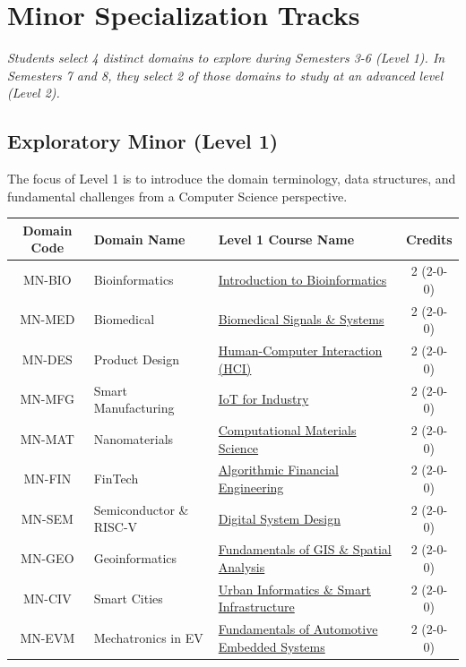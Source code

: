 \newpage
\section*{Minor Specialization Tracks}
\textit{Students select 4 distinct domains to explore during Semesters 3-6 (Level 1). In Semesters 7 and 8, they select 2 of those domains to study at an advanced level (Level 2).}

\label{table:minor_l1}
\subsection*{Exploratory Minor (Level 1)}
\noindent The focus of Level 1 is to introduce the domain terminology, data structures, and fundamental challenges from a Computer Science perspective.

\begin{longtable}{|c|p{4cm}|p{7.5cm}|c|}
\hline
\textbf{Domain Code} & \textbf{Domain Name} & \textbf{Level 1 Course Name} & \textbf{Credits} \\
\hline
MN-BIO & Bioinformatics & \hyperref[minor:BIO_L1]{Introduction to Bioinformatics} & 2 (2-0-0) \\
\hline
MN-MED & Biomedical & \hyperref[minor:MED_L1]{Biomedical Signals \& Systems} & 2 (2-0-0) \\
\hline
MN-DES & Product Design & \hyperref[minor:DES_L1]{Human-Computer Interaction (HCI)} & 2 (2-0-0) \\
\hline
MN-MFG & Smart Manufacturing & \hyperref[minor:MFG_L1]{IoT for Industry} & 2 (2-0-0) \\
\hline
MN-MAT & Nanomaterials & \hyperref[minor:MAT_L1]{Computational Materials Science} & 2 (2-0-0) \\
\hline
MN-FIN & FinTech & \hyperref[minor:FIN_L1]{Algorithmic Financial Engineering} & 2 (2-0-0) \\
\hline
MN-SEM & Semiconductor \& RISC-V & \hyperref[minor:SEM_L1]{Digital System Design} & 2 (2-0-0) \\
\hline
MN-GEO & Geoinformatics & \hyperref[minor:GEO_L1]{Fundamentals of GIS \& Spatial Analysis} & 2 (2-0-0) \\
\hline
MN-CIV & Smart Cities & \hyperref[minor:CIV_L1]{Urban Informatics \& Smart Infrastructure} & 2 (2-0-0) \\
\hline
MN-EVM & Mechatronics in EV & \hyperref[minor:EVM_L1]{Fundamentals of Automotive Embedded Systems} & 2 (2-0-0) \\
\hline
\end{longtable}

